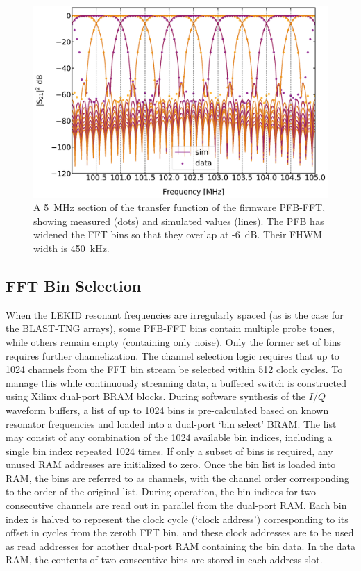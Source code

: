 \begin{figure}[!htbp]
\centering
\includegraphics[width=\textwidth]{figures/readout/sim/pfb_fft_comp}
\caption[~A 5~MHz section of the transfer function of the firmware PFB-FFT, showing measured (dots) and simulated values (lines).]{A 5~MHz section of the transfer function of the firmware PFB-FFT, showing measured (dots) and simulated values (lines). The PFB has widened the FFT bins so that they overlap at -6~dB. Their FHWM width is 450~kHz.}
\label{fig:pfb fft zoom}
\end{figure}

\subsection{FFT Bin Selection}\label{bin select}

When the LEKID resonant frequencies are irregularly spaced (as is the case for the BLAST-TNG arrays), some PFB-FFT bins contain multiple probe tones, while others remain empty (containing only noise). Only the former set of bins requires further channelization. The channel selection logic requires that up to 1024 channels from the FFT bin stream be selected within 512 clock cycles. To manage this while continuously streaming data, a buffered switch is constructed using Xilinx dual-port BRAM blocks. During software synthesis of the $I/Q$ waveform buffers, a list of up to 1024 bins is pre-calculated based on known resonator frequencies and loaded into a dual-port `bin select' BRAM. The list may consist of any combination of the 1024 available bin indices, including a single bin index repeated 1024 times. If only a subset of bins is required, any unused RAM addresses are initialized to zero. Once the bin list is loaded into RAM, the bins are referred to as channels, with the channel order corresponding to the order of the original list. During operation, the bin indices for two consecutive channels are read out in parallel from the dual-port RAM. Each bin index is halved to represent the clock cycle (`clock address') corresponding to its offset in cycles from the zeroth FFT bin, and these clock addresses are to be used as read addresses for another dual-port RAM containing the bin data. In the data RAM, the contents of two consecutive bins are stored in each address slot.

